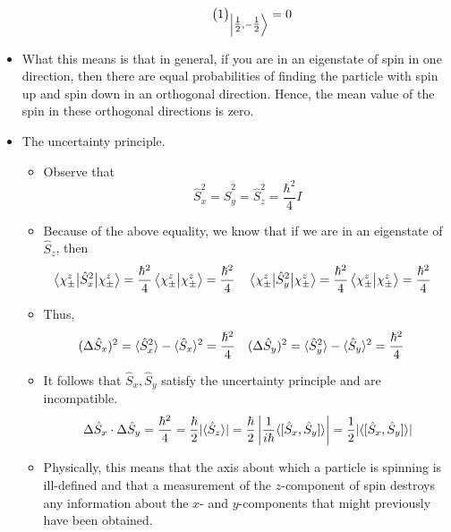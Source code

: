 \documentclass[../notes.tex]{subfiles}
\begin{document}
\begin{itemize}
\begin{itemize}
\begin{itemize}
\begin{align*}
{\begin{pmatrix}
                            1\\
                        \end{pmatrix}
                    }_{\ket{\tfrac{1}{2},-\tfrac{1}{2}}} &= 0
            \end{align*}
        \end{itemize}
    \end{itemize}
    \item What this means is that in general, if you are in an eigenstate of spin in one direction, then there are equal probabilities of finding the particle with spin up and spin down in an orthogonal direction. Hence, the mean value of the spin in these orthogonal directions is zero.
    \item The uncertainty principle.
    \begin{itemize}
        \item Observe that
        \begin{equation*}
            \hat{S}_x^2 = \hat{S}_y^2
            = \hat{S}_z^2
            = \frac{\hbar^2}{4}I
        \end{equation*}
        \item Because of the above equality, we know that if we are in an eigenstate of $\hat{S}_z$, then
        \begin{align*}
            \ev{\hat{S}_x^2}{\chi_\pm^z} &= \frac{\hbar^2}{4}\braket{\chi_\pm^z}
                = \frac{\hbar^2}{4}&
            \ev{\hat{S}_y^2}{\chi_\pm^z} &= \frac{\hbar^2}{4}\braket{\chi_\pm^z}
                = \frac{\hbar^2}{4}&
        \end{align*}
        \item Thus,
        \begin{align*}
            (\Delta\hat{S}_x)^2 &= \langle{\hat{S}_x^2}\rangle-\langle{\hat{S}_x}\rangle^2 = \frac{\hbar^2}{4}&
            (\Delta\hat{S}_y)^2 &= \langle{\hat{S}_y^2}\rangle-\langle{\hat{S}_y}\rangle^2 = \frac{\hbar^2}{4}
        \end{align*}
        \item It follows that $\hat{S}_x,\hat{S}_y$ satisfy the uncertainty principle and are incompatible.
        \begin{equation*}
            \Delta\hat{S}_x\cdot\Delta\hat{S}_y = \frac{\hbar^2}{4}
            = \frac{\hbar}{2}|\langle{\hat{S}_z}\rangle|
            = \frac{\hbar}{2}\left| \frac{1}{i\hbar}\langle{[\hat{S}_x,\hat{S}_y]}\rangle \right|
            = \frac{1}{2}|\langle{[\hat{S}_x,\hat{S}_y]}\rangle|
        \end{equation*}
        \item Physically, this means that the axis about which a particle is spinning is ill-defined and that a measurement of the $z$-component of spin destroys any information about the $x$- and $y$-components that might previously have been obtained.

\end{itemize}
\end{itemize}
\end{document}
